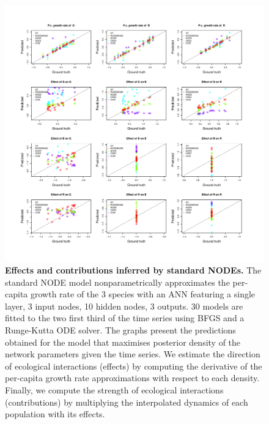 \documentclass[11pt, oneside]{article}
\begin{document}
\begin{figure}[H]
\includegraphics[width=1\linewidth,page=3]{figures/figures_supplementary.pdf}
\caption{
    \textbf{Effects and contributions inferred by standard NODEs.}
    The standard NODE model nonparametrically approximates the per-capita growth rate of the 3 species with an ANN featuring a single layer, 3 input nodes, 10 hidden nodes, 3 outputs.
    30 models are fitted to the two first third of the time series using BFGS and a Runge-Kutta ODE solver.
    The graphs present the predictions obtained for the model that maximises posterior density of the network parameters given the time series.
    We estimate the direction of ecological interactions (effects) by computing the derivative of the per-capita growth rate approximations with respect to each density.
    Finally, we compute the strength of ecological interactions (contributions) by multiplying the interpolated dynamics of each population with its effects.
}
\end{figure}
\newpage
\end{document}
